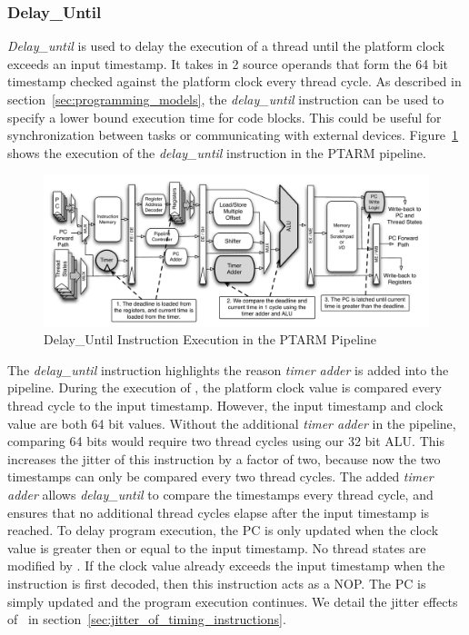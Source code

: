 \subsubsection{Delay\_Until}    
\emph{Delay\_until} is used to delay the execution of a thread until the platform clock exceeds an input timestamp.
It takes in 2 source operands that form the 64 bit timestamp checked against the platform clock every thread cycle.
As described in section~\ref{sec:programming_models}, the \emph{delay\_until} instruction can be used to specify a lower bound execution time for code blocks.
This could be useful for synchronization between tasks or communicating with external devices.
Figure~\ref{fig:delay_until_pipeline_implementation} shows the execution of the \emph{delay\_until} instruction in the PTARM pipeline.       
\begin{figure}[h]
  \begin{center}
    \includegraphics[scale=.54]{figs/delay_until_pipeline_implementation}
  \end{center}
  \vspace{-3mm}
  \caption{Delay\_Until Instruction Execution in the PTARM Pipeline}
  \label{fig:delay_until_pipeline_implementation}
\end{figure}

The \emph{delay\_until} instruction highlights the reason \emph{timer adder} is added into the pipeline.
During the execution of \delayuntil, the platform clock value is compared every thread cycle to the input timestamp.
However, the input timestamp and clock value are both 64 bit values.
Without the additional \emph{timer adder} in the pipeline, comparing 64 bits would require two thread cycles using our 32 bit ALU. 
This increases the jitter of this instruction by a factor of two, because now the two timestamps can only be compared every two thread cycles. 
The added \emph{timer adder} allows \emph{delay\_until} to compare the timestamps every thread cycle, and ensures that no additional thread cycles elapse after the input timestamp is reached. 
To delay program execution, the PC is only updated when the clock value is greater then or equal to the input timestamp.
No thread states are modified by \delayuntil.
If the clock value already exceeds the input timestamp when the instruction is first decoded, then this instruction acts as a NOP. 
The PC is simply updated and the program execution continues.
We detail the jitter effects of \delayuntil\ in section~\ref{sec:jitter_of_timing_instructions}.


